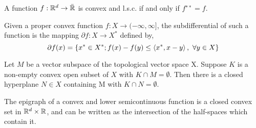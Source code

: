 \begin{corollary}
	A function $f:\mathbb{R}^d\rightarrow\bar{\mathbb{R}}$  is convex and l.s.c. if and only if $f^{∗∗}=f$.
\end{corollary}

\begin{definition}[Subdifferential]
	Given a proper convex function $f: X\rightarrow (-\infty, \infty]$, the subdifferential of such a function is the mapping $\partial f: X\rightarrow X^*$ defined by,
	\begin{equation*}
		\partial f (x)= \left\lbrace x^*\in X^*; f(x)-f(y) \leq \left\langle x^*, x-y \right\rangle,\ \forall y \in X \right\rbrace
	\end{equation*}
\end{definition}

\begin{theorem}
	Let $M$ be a vector subspace of the topological vector space X. Suppose $K$ is a non-empty convex open subset of $X$ with $K\cap M=\emptyset$. Then there is a closed hyperplane $N \in X$ containing M with $K \cap N = \emptyset$.
\end{theorem}

\begin{theorem}
	The epigraph of a convex and lower semicontinuous function is a closed convex set in $\mathbb{R}^d\times\mathbb{R}$, and can be written as the intersection of the half-spaces which contain it.
\end{theorem}
	
\begin{definition}
\end{definition}
\begin{theorem}
\end{theorem}


\begin{definition}[Duality]

\end{definition}